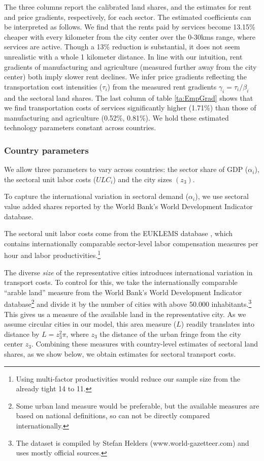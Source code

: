 \documentclass[12pt]{article}
\begin{document}
The three columns report the calibrated land shares, and the estimates for rent and price gradients, respectively, for each sector. The estimated coefficients can be interpreted as follows. We find that the rents paid by services become 13.15\% cheaper with every kilometer from the city center over the 0-30kms range, where services are active. Though a 13\% reduction is substantial, it does not seem unrealistic with a whole 1 kilometer distance. In line with our intuition, rent gradients of manufacturing and agriculture (measured further away from the city center) both imply slower rent declines. We infer price gradients reflecting the transportation cost intensities ($\tau_i$) from the measured rent gradients $\gamma_i=\tau_i/\beta_i$ and the sectoral land shares. The last column of table \ref{ta:EmpGrad} shows that we find transportation costs of services significantly higher (1.71\%) than those of manufacturing and agriculture (0.52\%, 0.81\%). We hold these estimated technology parameters constant across countries. %

\subsubsection{Country parameters}
We allow three parameters to vary across countries: the sector share of GDP ($\alpha_i$), the sectoral unit labor costs ($ULC_i$) and the city sizes $(z_3)$.

To capture the international variation in sectoral demand ($\alpha_i$), we use sectoral value added shares reported by the World Bank's World Development Indicator database.

The sectoral unit labor costs come from the EUKLEMS database , which contains internationally comparable sector-level labor compensation measures per hour and labor productivities.\footnote{Using multi-factor productivities would reduce our sample size from the already tight 14 to 11.}

The diverse \emph{size} of the representative cities introduces international variation in transport costs. To control for this, we take the internationally comparable ``arable land'' measure from the World Bank's World Development Indicator database\footnote{Some urban land measure would be preferable, but the available measures are based on national definitions, so can not be directly compared internationally.} and divide it by the number of cities with above 50.000 inhabitants.\footnote{The dataset is compiled by Stefan Helders (www.world-gazetteer.com) and uses mostly official sources.} This gives us a measure of the available land in the representative city. As we assume circular cities in our model, this area measure ($L$) readily translates into distance by $L=z_3^2\pi$, where $z_3$ the distance of the urban fringe from the city center $z_3$. Combining these measures with country-level estimates of sectoral land shares, as we show below, we obtain estimates for sectoral transport costs.
\end{document}

